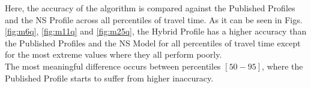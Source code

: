 \documentclass[letterpaper, 10 pt, conference]{ieeeconf}  %
\begin{document}

Here, the accuracy of the algorithm is compared against the Published Profiles and the NS Profile across all percentiles of travel time.
As it can be seen in Figs. \ref{fig:m6q}, \ref{fig:m11q} and \ref{fig:m25q}, the Hybrid Profile has a higher accuracy than the Published Profiles and the NS Model for all percentiles of travel time except for the most extreme values where they all perform poorly.\\
The most meaningful difference occurs between percentiles $[50-95]$, where the Published Profile starts to suffer from higher inaccuracy.



\end{document}
